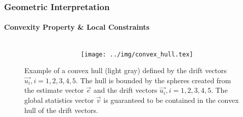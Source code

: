 \documentclass[hyperref={pdfpagelabels=false}]{beamer}
\begin{document}
\begin{frame} \frametitle{Geometric Interpretation}\framesubtitle{Convexity Property \& Local Constraints}
\begin{figure}[H]
\begin{columns}
\begin{column}[t]{0.35\textwidth}
\vspace{-6.1cm}
\caption{Example of a convex hull (light gray) defined by the drift vectors $\vec{u_i}, i=1,2,3,4,5$. The hull is bounded by the spheres created from the estimate vector $\vec{e}$ and the drift vectors $\vec{u_i}, i=1,2,3,4,5$. The global statistics vector $\vec{v}$ is guaranteed to be contained in the convex hull of the drift vectors.} 
\end{column}
\begin{column}[t]{0.65\textwidth}
\vspace{-4cm}
\texttt{[image: ../img/convex\_hull.tex]}
\end{column}
\end{columns}
\label{fig:convexHull}
\end{figure}
\end{frame}

%
%
%
\end{document}
